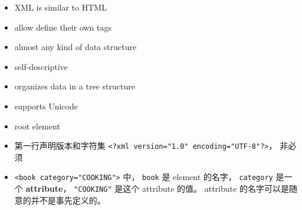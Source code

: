 
\begin{issues}
\issueDraft
\end{issues}

\begin{itemize}
\item XML is similar to HTML
\item allow define their own tags
\item almost any kind of data structure
\item self-descriptive
\item organizes data in a tree structure
\item supports Unicode
\item root element
\item 第一行声明版本和字符集 \verb|<?xml version="1.0" encoding="UTF-8"?>|， 非必须
\item \verb|<book category="COOKING">| 中， \verb|book| 是 element 的名字， \verb|category| 是一个 \textbf{attribute}， \verb|"COOKING"| 是这个 attribute 的值。 attribute 的名字可以是随意的并不是事先定义的。
\end{itemize}
